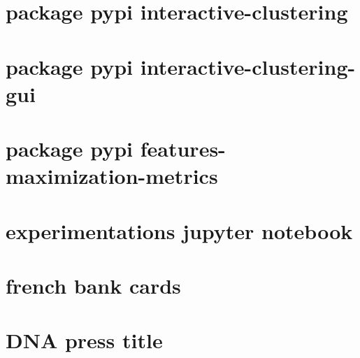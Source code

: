 \label{annex:B_ANNEXE_TECHNIQUE}

	\minitoc

    \section{package pypi interactive-clustering}
    \section{package pypi interactive-clustering-gui}
    \section{package pypi features-maximization-metrics}
    \section{experimentations jupyter notebook}

\label{annex:C_ANNEXE_DATASET}

	\minitoc

    \section{french bank cards}
    \section{DNA press title}